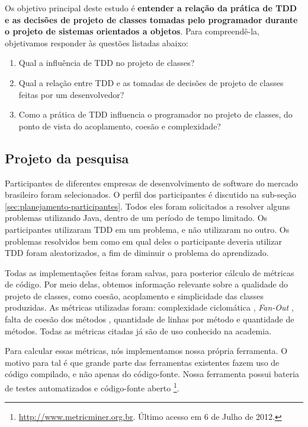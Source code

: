 \documentclass[conference]{IEEEtran}
\begin{document}
Os objetivo principal deste estudo é \textbf{entender a relação da prática de TDD 
e as decisões de projeto de classes tomadas pelo programador durante o 
projeto de sistemas orientados a objetos}.
Para compreendê-la, objetivamos responder às questões listadas
abaixo:

\begin{enumerate}

	\item Qual a influência de TDD no projeto de classes?

	\item Qual a relação entre TDD e as tomadas de decisões de projeto de classes
	feitas por um desenvolvedor?

	\item Como a prática de TDD influencia o programador no 
	projeto de classes, do ponto de vista do acoplamento, coesão e complexidade?

\end{enumerate}

\subsection{Projeto da pesquisa}

Participantes de diferentes empresas de desenvolvimento de software do mercado
brasileiro foram selecionados. O perfil dos participantes é 
discutido na sub-seção \ref{sec:planejamento-participantes}. 
Todos eles foram solicitados a resolver 
alguns problemas utilizando Java, dentro de um período de tempo limitado. 
Os participantes utilizaram TDD em um problema, e não utilizaram
no outro. Os problemas resolvidos bem como em qual deles o participante
deveria utilizar TDD foram aleatorizados, a fim de diminuir o problema do aprendizado.

Todas as implementações feitas foram salvas, para posterior
cálculo de métricas de código. 
Por meio delas, obtemos
informação relevante sobre a qualidade do projeto de classes, como coesão, acoplamento
e simplicidade das classes produzidas.
As métricas utilizadas foram: complexidade ciclomática \cite{mccabe}, \textit{Fan-Out} \cite{lorenz},
falta de coesão dos métodos \cite{lcom-hs}, quantidade de linhas por método e quantidade de métodos.
Todas as métricas citadas já são de uso conhecido na academia.

Para calcular essas
métricas, nós implementamos nossa própria ferramenta. O motivo para tal é que
grande parte das ferramentas existentes fazem uso de código compilado, e não
apenas do código-fonte. Nossa ferramenta possui bateria de testes automatizados
e código-fonte aberto \footnote{\url{http://www.metricminer.org.br}. 
Último acesso em 6 de Julho de 2012.}.
\end{document}
